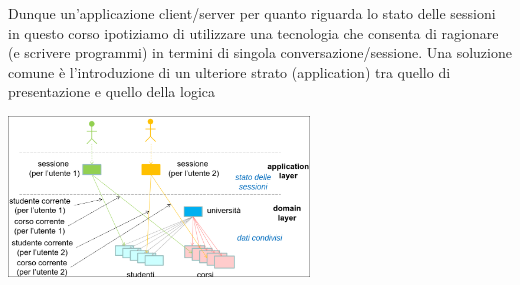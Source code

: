 \documentclass{article}
\begin{document}
Dunque un'applicazione client/server per quanto riguarda lo stato delle sessioni in questo corso ipotiziamo di utilizzare una tecnologia che consenta di ragionare (e scrivere programmi) in termini di singola conversazione/sessione. Una soluzione comune è l'introduzione di un ulteriore strato (\vopen application\vclose) tra quello di presentazione e quello della logica
\begin{center}
    \includegraphics[width=8cm]{images/application layer.png}
\end{center}
\end{document}
